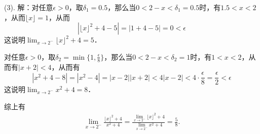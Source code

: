 \noindent (3). 解：对任意$\epsilon > 0$，取$\delta_1 = 0.5$，那么当$0 < 2-x < \delta_1 = 0.5$时，有$1.5 < x < 2$，从而$\lfloor x \rfloor = 1$，从而
\begin{equation}
    |\lfloor x \rfloor^2 + 4 - 5| = |1 + 4 - 5| = 0 < \epsilon
\end{equation}
这说明$\displaystyle\lim_{x \to 2^-} \lfloor x \rfloor^2 + 4 = 5$．

\noindent 对任意$\epsilon > 0$，取$\delta_2 = \min \{ 1, \displaystyle\frac{\epsilon}{8} \}$，那么当$0 < 2 - x < \delta_2 = 1$时，有$1 < x < 2$，从而有$|x+2| < 4$，从而有
\begin{equation}
    |x^2 + 4 - 8| = |x^2 - 4| = |x-2||x+2| < 4 |x-2| < 4 \cdot \frac{\epsilon}{8} = \frac{\epsilon}{2} < \epsilon
\end{equation}
这说明$\displaystyle\lim_{x \to 2^-} x^2 + 4 = 8$．

\noindent 综上有
\begin{align}
    \lim_{x \to 2^-} \frac{\lfloor x \rfloor^2 + 4}{x^2 + 4} = \frac{\displaystyle\lim_{x \to 2^-} \lfloor x \rfloor^2 + 4}{\displaystyle\lim_{x \to 2^-} x^2 + 4} = \frac{5}{8}.
\end{align}
